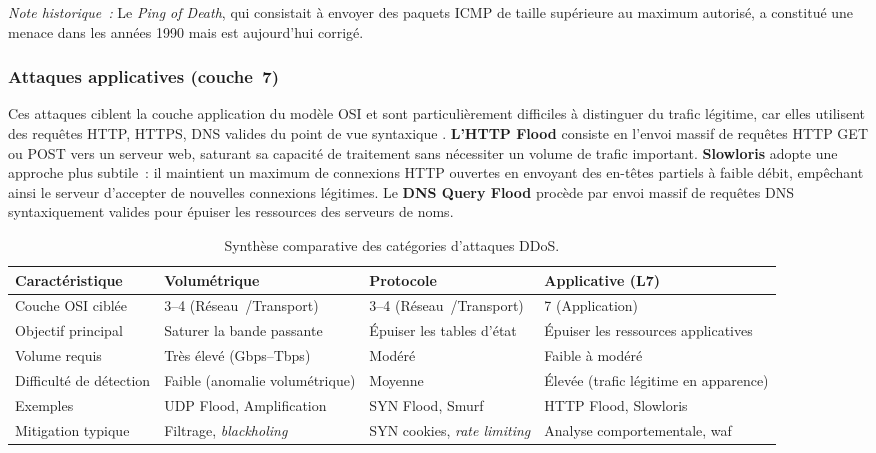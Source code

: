 \noindent\textit{Note historique~:} Le \textit{Ping of Death}, qui consistait à envoyer des paquets ICMP de taille supérieure au maximum autorisé, a constitué une menace dans les années 1990 mais est aujourd'hui corrigé.

\subsubsection{Attaques applicatives (couche~7)}

Ces attaques ciblent la couche application du modèle OSI et sont particulièrement difficiles à distinguer du trafic légitime, car elles utilisent des requêtes HTTP, HTTPS, DNS valides du point de vue syntaxique \parencite{zargar2013survey}. \textbf{L'HTTP Flood} consiste en l'envoi massif de requêtes HTTP GET ou POST vers un serveur web, saturant sa capacité de traitement sans nécessiter un volume de trafic important. \textbf{Slowloris} adopte une approche plus subtile~: il maintient un maximum de connexions HTTP ouvertes en envoyant des en-têtes partiels à faible débit, empêchant ainsi le serveur d'accepter de nouvelles connexions légitimes. Le \textbf{DNS Query Flood} procède par envoi massif de requêtes DNS syntaxiquement valides pour épuiser les ressources des serveurs de noms.

\begin{table}[H]
\centering
\caption{Synthèse comparative des catégories d'attaques DDoS.}
\label{tab:classif_ddos}
\small

\renewcommand{\arraystretch}{1.3}

\begin{tabularx}{\textwidth}{|l|X|X|X|}
\hline
\textbf{Caractéristique} & \textbf{Volumétrique} & \textbf{Protocole} & \textbf{Applicative (L7)} \\
\hline

Couche OSI ciblée & 3--4 (Réseau~/Transport) & 3--4 (Réseau~/Transport) & 7 (Application) \\
\hline

Objectif principal & Saturer la bande passante & Épuiser les tables d'état & Épuiser les ressources applicatives \\
\hline

Volume requis & Très élevé (Gbps--Tbps) & Modéré & Faible à modéré \\
\hline

Difficulté de détection & Faible (anomalie volumétrique) & Moyenne & Élevée (trafic légitime en apparence) \\
\hline

Exemples & UDP Flood, Amplification & SYN Flood, Smurf & HTTP Flood, Slowloris \\
\hline

Mitigation typique & Filtrage, \textit{blackholing} & SYN cookies, \textit{rate limiting} & Analyse comportementale, \gls{waf} \\
\hline

\end{tabularx}
\end{table}

